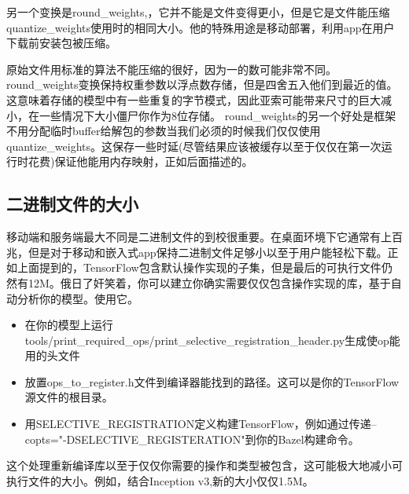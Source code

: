 另一个变换是round\_weights,，它并不能是文件变得更小，但是它是文件能压缩quantize\_weights使用时的相同大小。他的特殊用途是移动部署，利用app在用户下载前安装包被压缩。

原始文件用标准的算法不能压缩的很好，因为一的数可能非常不同。round\_weights变换保持权重参数以浮点数存储，但是四舍五入他们到最近的值。这意味着存储的模型中有一些重复的字节模式，因此亚索可能带来尺寸的巨大减小，在一些情况下大小僵尸你作为8位存储。
round\_weights的另一个好处是框架不用分配临时buffer给解包的参数当我们必须的时候我们仅仅使用quantize\_weights。这保存一些时延(尽管结果应该被缓存以至于仅仅在第一次运行时花费)保证他能用内存映射，正如后面描述的。
\subsection{二进制文件的大小}
移动端和服务端最大不同是二进制文件的到校很重要。在桌面环境下它通常有上百兆，但是对于移动和嵌入式app保持二进制文件足够小以至于用户能轻松下载。正如上面提到的，TensorFlow包含默认操作实现的子集，但是最后的可执行文件仍然有12M。俄日了奸笑着，你可以建立你确实需要仅仅包含操作实现的库，基于自动分析你的模型。使用它。
\begin{itemize}
\item 在你的模型上运行tools/print\_required\_ops/print\_selective\_registration\_header.py生成使op能用的头文件
\item 放置ops\_to\_register.h文件到编译器能找到的路径。这可以是你的TensorFlow源文件的根目录。
\item 用SELECTIVE\_REGISTRATION定义构建TensorFlow，例如通过传递--copts="-DSELECTIVE\_REGISTERATION"到你的Bazel构建命令。
\end{itemize}
这个处理重新编译库以至于仅仅你需要的操作和类型被包含，这可能极大地减小可执行文件的大小。例如，结合Inception v3,新的大小仅仅1.5M。
